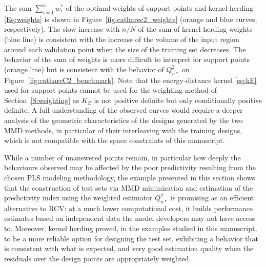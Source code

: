 The sum $\sum_{i=1}^n w_i^*$ of the optimal weights of support points and kernel herding \eqref{Eq:weights} is shown in  Figure~\ref{fig:catharec2_weights} (orange and blue curves, respectively). The slow increase with $n/N$ of the sum of kernel-herding weights (blue line) is consistent with the increase of the volume of the input region around each validation point when the size of the training set decreases. 
The behavior of the sum of weights is more difficult to interpret for support points (orange line) but is consistent with the behavior of $Q_{n*}^2$ on Figure~\ref{fig:cathareC2_benchmark}. Note that the energy-distance kernel \eqref{eq:kE} used for support points cannot be used for the weighting method of Section~\ref{S:weighting} as $K_E$ is not positive definite but only conditionally positive definite. A full understanding of the observed curves would require a deeper analysis of the geometric characteristics of the designs generated by the two MMD methods, in particular of their interleaving with the training designs, which is not compatible with the space constraints of this manuscript.

While a number of unanswered points remain, in particular how deeply the behaviours observed may be affected by the poor predictivity resulting from the chosen PLS modeling methodology, the example presented in this section shows that  the construction of test sets via MMD minimization and estimation of the predictivity index using the weighted estimator $Q_{n*}^2$ is promising as an efficient alternative to RCV: at a much lower computational cost, it  builds performance estimates based on independent data the model developers may not have access to. Moreover, kernel herding proved, in the examples studied in this manuscript, to be a more reliable option for designing the test set, exhibiting a behavior that is consistent with what is expected, and very good estimation quality when the residuals over the design points are appropriately weighted.



